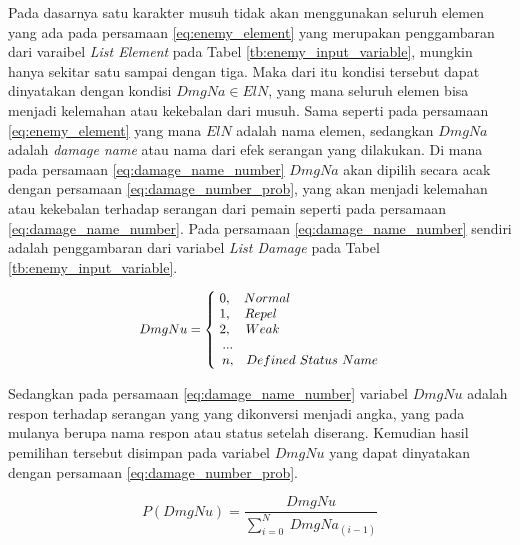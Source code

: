 Pada dasarnya satu karakter musuh tidak akan menggunakan seluruh elemen yang ada pada persamaan \ref{eq:enemy_element} yang merupakan penggambaran dari varaibel \textit{List Element} pada Tabel \ref{tb:enemy_input_variable}, mungkin hanya sekitar satu sampai dengan tiga. Maka dari itu kondisi tersebut dapat dinyatakan dengan kondisi $DmgNa \in ElN$, yang mana seluruh elemen bisa menjadi kelemahan atau kekebalan dari musuh. Sama seperti pada persamaan \ref{eq:enemy_element} yang mana $ElN$ adalah nama elemen, sedangkan $DmgNa$ adalah \textit{damage name} atau nama dari efek serangan yang dilakukan. Di mana pada persamaan \ref{eq:damage_name_number} $DmgNa$ akan dipilih secara acak dengan persamaan \ref{eq:damage_number_prob}, yang akan menjadi kelemahan atau kekebalan terhadap serangan dari pemain seperti pada persamaan \ref{eq:damage_name_number}. Pada persamaan \ref{eq:damage_name_number} sendiri adalah penggambaran dari variabel \textit{List Damage} pada Tabel \ref{tb:enemy_input_variable}. 
\vspace{1ex}

\begin{equation}\label{eq:damage_name_number}
\resizebox{0.5\textwidth}{!}{%
	$DmgNu = \left\{\begin{matrix} 
	\hspace{0.0em} 0,  & \hspace{-7.0em} Normal \\
	\hspace{0.0em} 1,  & \hspace{-8.0em} Repel \\
	\hspace{0.0em} 2,  & \hspace{-7.7em} Weak \\
	\hspace{0.5em} ... & \\
	\hspace{0.5em} n,  & Defined\ Status\ Name
	\end{matrix}\right.$%
}
\end{equation}

Sedangkan pada persamaan \ref{eq:damage_name_number} variabel $DmgNu$ adalah respon terhadap serangan yang yang dikonversi menjadi angka, yang pada mulanya berupa nama respon atau status setelah diserang. Kemudian hasil pemilihan tersebut disimpan pada variabel $DmgNu$ yang dapat dinyatakan dengan persamaan \ref{eq:damage_number_prob}.
\vspace{1ex}

\begin{equation}\label{eq:damage_number_prob}
P(DmgNu) = \frac{DmgNu}{\sum_{i = 0}^{N}\ DmgNa_{(i - 1)}}
\end{equation}

